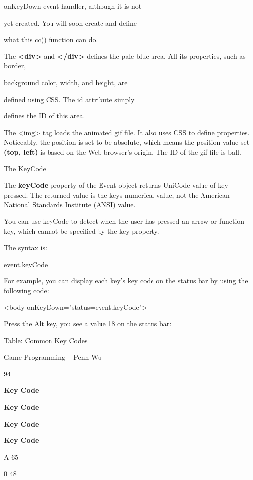 \documentclass[
]{article}
\begin{document}
onKeyDown event handler, although it is not

yet created. You will soon create and define

what this cc() function can do.

The \textbf{\textless div\textgreater{}} and
\textbf{\textless/div\textgreater{}} defines the pale-blue area. All its
properties, such as border,

background color, width, and height, are

defined using CSS. The id attribute simply

defines the ID of this area.

The \textless img\textgreater{} tag loads the animated gif file. It also
uses CSS to define properties. Noticeably, the position is set to be
absolute, which means the position value set \textbf{(top, left)} is
based on the Web browser's origin. The ID of the gif file is ball.

The KeyCode

The \textbf{keyCode} property of the Event object returns UniCode value
of key pressed. The returned value is the key\textquotesingle s
numerical value, not the American National Standards Institute (ANSI)
value.

You can use keyCode to detect when the user has pressed an arrow or
function key, which cannot be specified by the key property.

The syntax is:

event.keyCode

For example, you can display each key's key code on the status bar by
using the following code:

\textless body onKeyDown="status=event.keyCode"\textgreater{}

Press the Alt key, you see a value 18 on the status bar:

Table: Common Key Codes

Game Programming -- Penn Wu

94

\protect\hypertarget{index_split_007.htmlux5cux23p95}{}{}\textbf{Key
Code}

\textbf{}

\textbf{Key Code}

\textbf{}

\textbf{Key Code}

\textbf{}

\textbf{Key Code}

A 65

0 48
\end{document}
